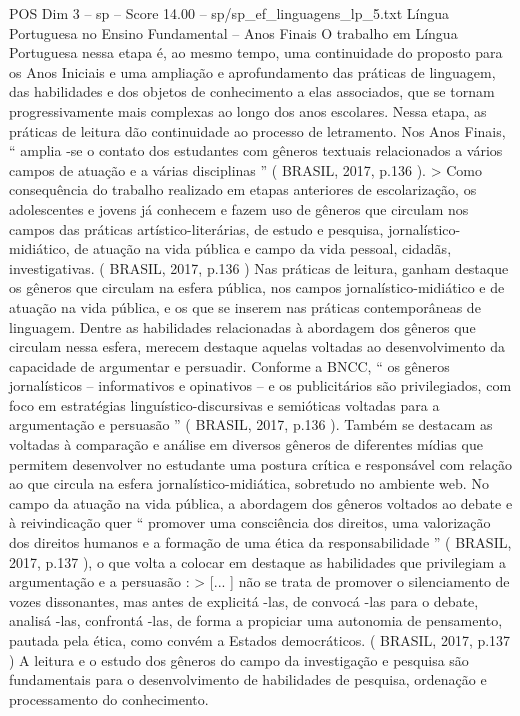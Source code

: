 \begin{textsample}{POS Dim 3 – sp – Score 14.00 – sp/sp\_ef\_linguagens\_lp\_5.txt}
Língua Portuguesa no Ensino Fundamental – Anos Finais O trabalho em Língua Portuguesa nessa etapa é, ao mesmo tempo, uma continuidade do proposto para os Anos Iniciais e uma ampliação e aprofundamento das práticas de linguagem, das habilidades e dos objetos de conhecimento a elas associados, que se tornam progressivamente mais complexas ao longo dos anos escolares.
Nessa etapa, as práticas de leitura dão continuidade ao processo de letramento.
Nos Anos Finais, “ amplia -se o contato dos estudantes com gêneros textuais relacionados a vários campos de atuação e a várias disciplinas ” ( BRASIL, 2017, p.136 ). > Como consequência do trabalho realizado em etapas anteriores de escolarização, os adolescentes e jovens já conhecem e fazem uso de gêneros que circulam nos campos das práticas artístico-literárias, de estudo e pesquisa, jornalístico-midiático, de atuação na vida pública e campo da vida pessoal, cidadãs, investigativas. ( BRASIL, 2017, p.136 ) Nas práticas de leitura, ganham destaque os gêneros que circulam na esfera pública, nos campos jornalístico-midiático e de atuação na vida pública, e os que se inserem nas práticas contemporâneas de linguagem.
Dentre as habilidades relacionadas à abordagem dos gêneros que circulam nessa esfera, merecem destaque aquelas voltadas ao desenvolvimento da capacidade de argumentar e persuadir.
Conforme a BNCC, “ os gêneros jornalísticos – informativos e opinativos – e os publicitários são privilegiados, com foco em estratégias linguístico-discursivas e semióticas voltadas para a argumentação e persuasão ” ( BRASIL, 2017, p.136 ).
Também se destacam as voltadas à comparação e análise em diversos gêneros de diferentes mídias que permitem desenvolver no estudante uma postura crítica e responsável com relação ao que circula na esfera jornalístico-midiática, sobretudo no ambiente web.
No campo da atuação na vida pública, a abordagem dos gêneros voltados ao debate e à reivindicação quer “ promover uma consciência dos direitos, uma valorização dos direitos humanos e a formação de uma ética da responsabilidade ” ( BRASIL, 2017, p.137 ), o que volta a colocar em destaque as habilidades que privilegiam a argumentação e a persuasão : > [... ] não se trata de promover o silenciamento de vozes dissonantes, mas antes de explicitá -las, de convocá -las para o debate, analisá -las, confrontá -las, de forma a propiciar uma autonomia de pensamento, pautada pela ética, como convém a Estados democráticos. ( BRASIL, 2017, p.137 ) A leitura e o estudo dos gêneros do campo da investigação e pesquisa são fundamentais para o desenvolvimento de habilidades de pesquisa, ordenação e processamento do conhecimento.

\end{textsample}
